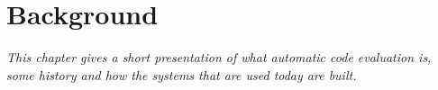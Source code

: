 \chapter{Background}

\textit{This chapter gives a short presentation of what automatic code evaluation is, some history and how the systems that are used today are built.}






